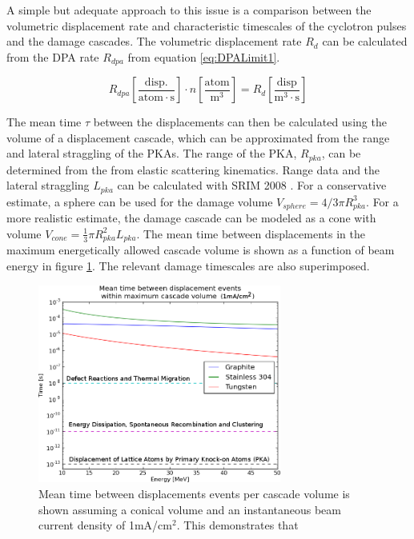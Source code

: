 \documentclass[final,3p,times,twocolumn]{elsarticle} %
\begin{document}
A simple but adequate approach to this issue is a comparison between the volumetric displacement rate and characteristic timescales of the cyclotron pulses and the damage cascades.  The volumetric displacement rate $R_d$ can be calculated from the DPA rate $R_{dpa}$ from equation \ref{eq:DPALimit1}.

\begin{equation}
R_{dpa}\left[\frac{\mathrm{disp}.}{\mathrm{atom}\cdot \mathrm{s}}\right] \cdot n \left[ \frac{\mathrm{atom}}{\mathrm{m}^3} \right] = R_d \left[ \frac{\mathrm{disp}}{\mathrm{m}^3\cdot \mathrm{s}} \right ] 
\label{eq:DPALimit1}
\end{equation}

The mean time $\tau$ between the displacements can then be calculated using the volume of a displacement cascade, which can be approximated from the range and lateral straggling of the PKAs.  The range of the PKA, $R_{pka}$, can be determined from the from elastic scattering kinematics. Range data and the lateral straggling $L_{pka}$ can be calculated with SRIM 2008 \cite{SRIM}.  For a conservative estimate, a sphere can be used for the damage volume  $V_{sphere} = 4/3 \pi R_{pka}^3$.  For a more realistic estimate, the damage cascade can be modeled as a cone with volume $V_{cone} =\frac{1}{3} \pi R_{pka}^2 L_{pka}$.  The mean time between displacements in the maximum energetically allowed cascade volume is shown as a function of beam energy in figure \ref{fig:DisplacementTime}.  The relevant damage timescales are also superimposed.

\begin{figure}[htbp]
\begin{center}
\includegraphics[width=80mm]{Figures/MeanDamageTime.png}
\caption{Mean time between displacements events per cascade volume is shown assuming a conical volume and an instantaneous beam current density of 1mA/cm$^2$. This demonstrates that }
\label{fig:DisplacementTime}
\end{center}
\end{figure}
\end{document}
